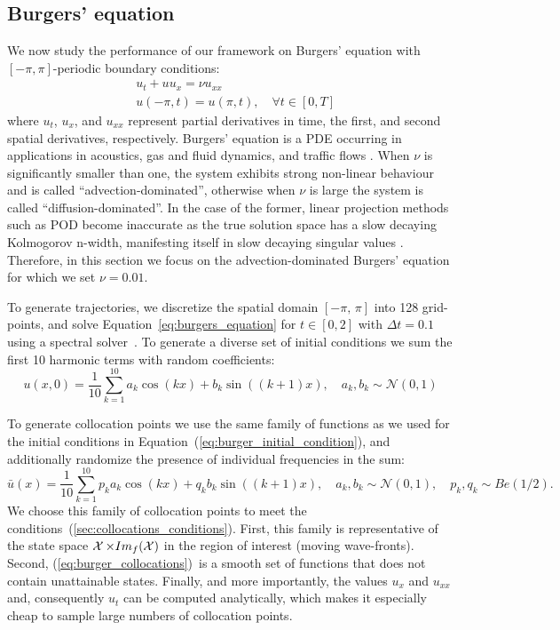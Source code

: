\subsection{Burgers' equation}
\label{sec:burger_eqn}
We now study the performance of our framework on Burgers' equation with $[-\pi, \pi]$-periodic boundary conditions:
\begin{equation}
\begin{split}
\label{eq:burgers_equation}
    & u_t  + uu_x = \nu u_{xx} \\
    & u(-\pi, t) = u(\pi, t),\quad \forall t \in [0, T]
\end{split}
\end{equation}
where $u_t$, $u_x$, and $u_{xx}$ represent partial derivatives in time, the first, and second spatial derivatives, respectively. Burgers' equation is a PDE occurring in applications in acoustics, gas and fluid dynamics, and traffic flows \cite{burgers1948mathematical}. When $\nu$ is significantly smaller than one, the system exhibits strong non-linear behaviour and is called ``advection-dominated'', otherwise when $\nu$ is large the system is called ``diffusion-dominated''. 
In the case of the former, linear projection methods such as POD become inaccurate as the true solution space has a slow decaying Kolmogorov n-width, manifesting itself in slow decaying singular values \cite{peherstorfer2022breaking}. Therefore, in this section we focus on the advection-dominated Burgers' equation for which we set $\nu = 0.01$.


To generate trajectories, we discretize the spatial domain $[-\pi,\,\pi]$ into 128 grid-points, and solve Equation~\ref{eq:burgers_equation} for $t \in [0, 2]$ with $\Delta t = 0.1$ using a spectral solver~\cite{trefethen2000spectral}. To generate a diverse set of initial conditions we sum the first 10 harmonic terms with random coefficients:
\begin{equation}
    \label{eq:burger_initial_condition}
    u(x, 0) = \frac{1}{10}\sum_{k = 1}^{10} a_k\cos(kx) + b_k\sin((k+1)x), \quad a_k, b_k \sim \mathcal{N}(0, 1)
\end{equation}

To generate collocation points we use the same family of functions as we used for the initial conditions in Equation~(\ref{eq:burger_initial_condition}), and additionally randomize the presence of individual frequencies in the sum:
\begin{equation}
    \label{eq:burger_collocations}
    \bar{u}(x) = \frac{1}{10}\sum_{k = 1}^{10} p_ka_k\cos(kx) + q_kb_k\sin((k+1)x), \quad a_k, b_k \sim \mathcal{N}(0, 1), \quad p_k, q_k \sim Be(1/2).
\end{equation}
We choose this family of collocation points to meet the conditions~(\ref{sec:collocations_conditions}). First, this family is representative of the state space $\operatorname{\mathcal{X}}\times Im_f(\operatorname{\mathcal{X}})$ in the region of interest (moving wave-fronts). Second, (\ref{eq:burger_collocations})~is a smooth set of functions that does not contain unattainable states. Finally, and more importantly, the values $u_x$ and $u_{xx}$ and, consequently $u_t$ can be computed analytically, which makes it especially cheap to sample large numbers of collocation points. 

